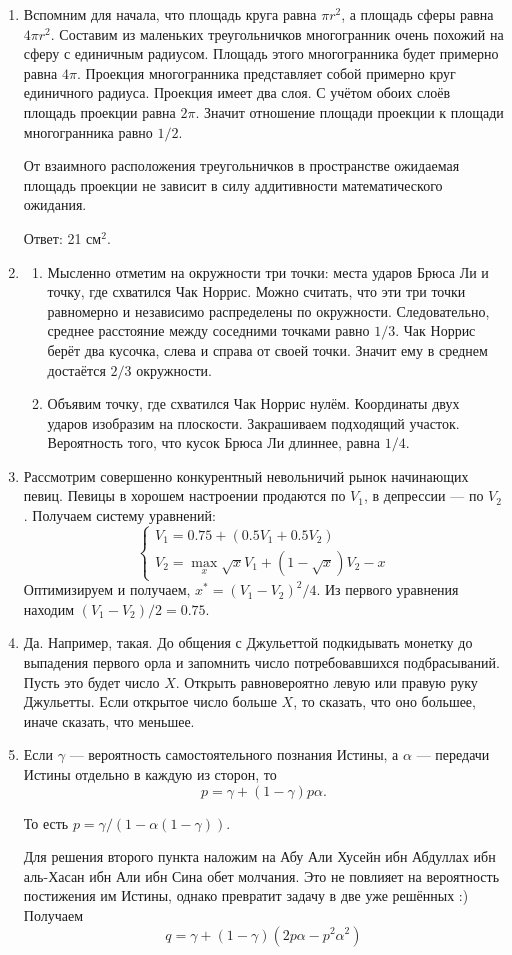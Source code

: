 \begin{enumerate}
\item Вспомним для начала, что площадь круга равна $\pi r^2$, а площадь сферы равна
$4\pi r^2$. Составим из маленьких треугольничков многогранник очень похожий на сферу
с единичным радиусом. Площадь этого многогранника будет примерно равна $4\pi$.
Проекция многогранника представляет собой примерно круг единичного радиуса.
Проекция имеет два слоя. С учётом обоих слоёв площадь проекции равна $2\pi$.
Значит отношение площади проекции к площади многогранника равно $1/2$.

От взаимного расположения треугольничков в пространстве ожидаемая площадь
проекции не зависит в силу аддитивности математического ожидания.

Ответ: 21 см$^2$.

\item
\begin{enumerate}
\item Мысленно отметим на окружности три точки: места ударов Брюса Ли и точку,
где схватился Чак Норрис. Можно считать, что эти три точки равномерно и независимо
распределены по окружности. Следовательно, среднее расстояние между соседними
точками равно $1/3$. Чак Норрис берёт два кусочка, слева и справа от своей точки.
Значит ему в среднем достаётся $2/3$ окружности.
\item Объявим точку, где схватился Чак Норрис нулём. Координаты двух ударов
изобразим на плоскости. Закрашиваем подходящий участок. Вероятность того, что
кусок Брюса Ли длиннее, равна $1/4$.
\end{enumerate}

\item  Рассмотрим совершенно конкурентный невольничий рынок начинающих певиц.
Певицы в хорошем настроении продаются по $V_1$, в депрессии — по $V_2$.
Получаем систему уравнений:
\[
\begin{cases}
  V_1 = 0.75 + (0.5 V_1 + 0.5 V_2) \\
  V_2 = \max_x \sqrt{x}V_1 + (1 - \sqrt{x})V_2 - x
\end{cases}
\]
Оптимизируем и получаем, $x^* = (V_1 - V_2)^2/4$. Из первого уравнения находим
$(V_1 - V_2)/2=0.75$.

\item Да. Например, такая. До общения с Джульеттой подкидывать монетку до выпадения
первого орла и запомнить число потребовавшихся подбрасываний. Пусть это будет число $X$.
Открыть равновероятно левую или правую руку Джульетты. Если открытое число больше $X$,
то сказать, что оно большее, иначе сказать, что меньшее.
\item Если $\gamma$ — вероятность самостоятельного познания Истины, а $\alpha$ —
передачи Истины отдельно в каждую из сторон, то
\[
p = \gamma + (1-\gamma) p \alpha.
\]

То есть $p=\gamma/(1-\alpha(1-\gamma))$.

Для решения второго пункта наложим на Абу Али Хусейн ибн Абдуллах ибн аль-Хасан
ибн Али ибн Сина обет молчания. Это не повлияет на вероятность постижения им Истины,
однако превратит задачу в две уже решённых :) Получаем
\[
q = \gamma + (1-\gamma)(2p\alpha - p^2\alpha^2)
\]
\end{enumerate}



